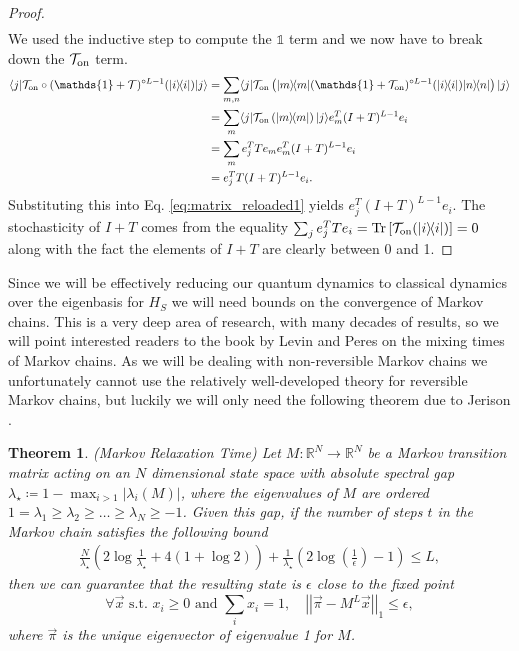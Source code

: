 \documentclass{article}
\newtheorem{theorem}{Theorem}
\newcommand{\on}{\rm on}
\newcommand{\ket}[1]{|#1\rangle}
\newcommand{\bra}[1]{\langle #1|}
\newcommand{\ketbra}[2]{| #1\rangle\! \langle #2|}
\newcommand{\brackets}[1]{\left[ #1 \right]}
\newcommand{\norm}[1]{\left| \left| #1 \right| \right|}
\DeclareMathOperator{\Tr}{Tr}
\newcommand{\trace}[1]{\Tr \brackets{ #1 }}
\newcommand{\identity}{\mathds{1}}
\begin{document}
\begin{proof}
\begin{align}
\end{align}
We used the inductive step to compute the $\identity$ term and we now have to break down the $\mathcal{T}_{\on}$ term. 
\begin{align}
    \bra{j} \mathcal{T}_{\on} \circ (\identity + \mathcal{T})^{\circ L - 1} (\ketbra{i}{i}) \ket{j} &= \sum_{m, n} \bra{j} \mathcal{T}_{\on}\left( \ketbra{m}{m} (\identity + \mathcal{T}_{\on})^{\circ L - 1} (\ketbra{i}{i}) \ketbra{n}{n} \right) \ket{j} \\
    &= \sum_{m} \bra{j} \mathcal{T}_{\on} \left( \ketbra{m}{m} \right) \ket{j} e_m^T (I + T)^{L - 1} e_i \\
    &= \sum_m e_j^T T e_m e_m^T (I + T)^{L -1} e_i \\
    &= e_j^T T(I + T)^{L-1} e_i.
\end{align}
Substituting this into Eq. \eqref{eq:matrix_reloaded1} yields $e_j^T (I + T)^{L-1} e_i$. The stochasticity of $I + T$ comes from the equality $\sum_j e_j^T T e_i = \trace{\mathcal{T}_{\on}(\ketbra{i}{i})} = 0$ along with the fact the elements of $I + T$ are clearly between 0 and 1.
\end{proof}

Since we will be effectively reducing our quantum dynamics to classical dynamics over the eigenbasis for $H_S$ we will need bounds on the convergence of Markov chains. This is a very deep area of research, with many decades of results, so we will point interested readers to the book by Levin and Peres \cite{levin2017markov} on the mixing times of Markov chains. As we will be dealing with non-reversible Markov chains we unfortunately cannot use the relatively well-developed theory for reversible Markov chains, but luckily we will only need the following theorem due to Jerison \cite{jerison2013general}.
\begin{theorem}(Markov Relaxation Time) \label{thm:markov_chain_bound}
    Let $M : \mathbb{R}^{N} \to  \mathbb{R}^{N}$ be a Markov transition matrix acting on an $N$ dimensional state space with absolute spectral gap $\lambda_{\star} \coloneqq 1 - \max_{i > 1} |\lambda_i(M)|$, where the eigenvalues of $M$ are ordered $1 = \lambda_1 \ge \lambda_2 \ge \ldots \ge \lambda_N \geq -1$. Given this gap, if the number of steps $t$ in the Markov chain satisfies the following bound
    \begin{align}
        \frac{N}{\lambda_{\star}} \left( 2\log \frac{1}{\lambda_{\star}} + 4(1 + \log 2)\right) + \frac{1}{\lambda_{\star}} \left(2 \log \left( \frac{1}{\epsilon} \right) - 1\right) \le L,
    \end{align}
    then we can guarantee that the resulting state is $\epsilon$ close to the fixed point
    \begin{equation}
        \forall \vec{x} \text{ s.t. } x_i \ge 0 \text{ and } \sum_i x_i = 1, \quad \norm{\vec{\pi} - M^L \vec{x}}_1 \le \epsilon,
    \end{equation}
    where $\vec{\pi}$ is the unique eigenvector of eigenvalue 1 for $M$.
\end{theorem}
\end{document}
